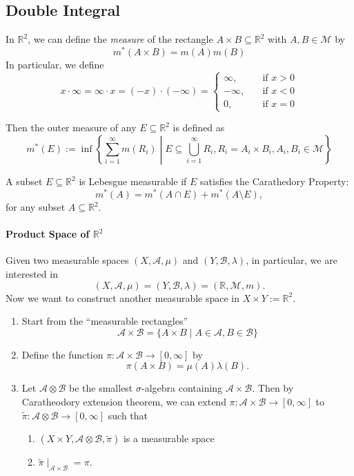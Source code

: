 \subsection{Double Integral}
\begin{definition}
In $\mathbb{R}^2$, we can define the \emph{measure} of the rectangle 
$A\times B\subseteq\mathbb{R}^2$ with $A,B\in\mathcal{M}$ by
\[
m^*(A\times B) = m(A)m(B)
\]
In particular, we define
\[
x\cdot\infty=\infty\cdot x=(-x)\cdot(-\infty)=\left\{
\begin{aligned}
\infty,&\quad\text{if $x>0$}\\
-\infty,&\quad\text{if $x<0$}\\
0,&\quad\text{if $x=0$}
\end{aligned}
\right.
\]
\end{definition}
\begin{definition}
Then the outer measure of any $E\subseteq\mathbb{R}^2$ is defined as
\[
m^*(E):=\inf\left\{
\sum_{i=1}^\infty m(R_i)\middle|
E\subseteq\bigcup_{i=1}^\infty R_i,
R_i = A_i\times B_i, A_i,B_i\in\mathcal{M}
\right\}
\]
\end{definition}
\begin{definition}
A subset $E\subseteq\mathbb{R}^2$ is Lebesgue measurable if $E$ satisfies the Carathedory Property:
\[
m^*(A) = m^*(A\cap E)+m^*(A\setminus E),
\]
for any subset $A\subseteq\mathbb{R}^2$.
\end{definition}

\paragraph{Product Space of $\mathbb{R}^2$}
Given two measurable spaces $(X,\mathcal{A},\mu)$ and $(Y,\mathcal{B},\lambda)$, in particular, we are interested in 
\[
(X,\mathcal{A},\mu)=(Y,\mathcal{B},\lambda)=(\mathbb{R},\mathcal{M},m).
\]
Now we want to construct another measurable space in $X\times Y:=\mathbb{R}^2$.
\begin{enumerate}
\item
Start from the ``measurable rectangles''
\[
\mathcal{A}\times\mathcal{B}
=
\{A\times B\mid A\in\mathcal{A},B\in\mathcal{B}\}
\]
\item
Define the function $\pi:\mathcal{A}\times\mathcal{B}\to[0,\infty]$ by
\[
\pi(A\times B)= \mu(A)\lambda(B).
\]
\item
Let $\mathcal{A}\otimes \mathcal{B}$ be the smallest $\sigma$-algebra containing $\mathcal{A}\times\mathcal{B}$.
Then by Caratheodory extension theorem, we can extend $\pi:\mathcal{A}\times\mathcal{B}\to[0,\infty]$ to $\tilde{\pi}:\mathcal{A}\otimes \mathcal{B}\to[0,\infty]$ such that 
\begin{enumerate}
\item
$(X\times Y,\mathcal{A}\otimes\mathcal{B},\tilde{\pi})$ is a measurable space
\item
$\tilde{\pi}\mid_{\mathcal{A}\times\mathcal{B}}=\pi$.
\end{enumerate}
\end{enumerate}


